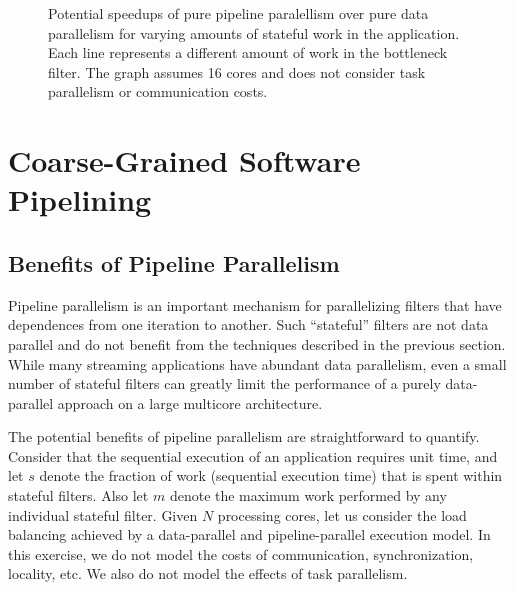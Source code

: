 \begin{figure}[t]
\centering
{}
\caption{Potential speedups of pure pipeline paralellism over pure data
parallelism for varying amounts of stateful work in the application.
Each line represents a different amount of work in the bottleneck
filter.  The graph assumes 16 cores and does not consider task
parallelism or communication costs.
\protect\label{fig:model-speedup}}
\end{figure}

\section{Coarse-Grained Software Pipelining}
\label{sec:softpipe}

\subsection{Benefits of Pipeline Parallelism}
\label{sec:pipeline-model}

Pipeline parallelism is an important mechanism for parallelizing
filters that have dependences from one iteration to another.  Such
``stateful'' filters are not data parallel and do not benefit from the
techniques described in the previous section.  While many streaming
applications have abundant data parallelism, even a small number of
stateful filters can greatly limit the performance of a purely
data-parallel approach on a large multicore architecture.

The potential benefits of pipeline parallelism are straightforward to
quantify.  Consider that the sequential execution of an application
requires unit time, and let $s$ denote the fraction of work
(sequential execution time) that is spent within stateful filters.
Also let $m$ denote the maximum work performed by any individual
stateful filter.  Given $N$ processing cores, let us consider the load
balancing achieved by a data-parallel and pipeline-parallel execution
model.  In this exercise, we do not model the costs of communication,
synchronization, locality, etc.  We also do not model the effects of
task parallelism.

